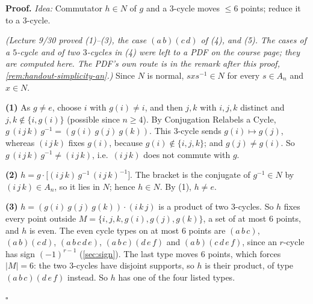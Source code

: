 \documentclass[11pt]{report}
\renewenvironment{proof}[1][Proof]{\noindent\textbf{#1.} }{\hfill$\square$\par\vspace{5pt}}
\begin{document}
\begin{proof}
\textit{Idea:} Commutator $h \in N$ of $g$ and a $3$-cycle moves $\leq 6$ points; reduce it to a $3$-cycle.\par
\textit{(Lecture 9/30 proved (1)--(3), the case $(a\,b)(c\,d)$ of (4), and (5). The cases of a $5$-cycle and of two $3$-cycles in (4) were left to a PDF on the course page; they are computed here. The PDF's own route is in the remark after this proof, \ref{rem:handout-simplicity-an}.)} Since $N$ is normal, $sxs^{-1} \in N$ for every $s \in A_n$ and $x \in N$.

\textbf{(1)} As $g \neq e$, choose $i$ with $g(i) \neq i$, and then $j, k$ with $i, j, k$ distinct and $j, k \notin \{i, g(i)\}$ (possible since $n \geq 4$). By Conjugation Relabels a Cycle, $g\,(i\,j\,k)\,g^{-1} = (g(i)\ g(j)\ g(k))$. This $3$-cycle sends $g(i) \mapsto g(j)$, whereas $(i\,j\,k)$ fixes $g(i)$, because $g(i) \notin \{i, j, k\}$; and $g(j) \neq g(i)$. So $g\,(i\,j\,k)\,g^{-1} \neq (i\,j\,k)$, i.e.\ $(i\,j\,k)$ does not commute with $g$.

\textbf{(2)} $h = g \cdot \big[(i\,j\,k)\,g^{-1}\,(i\,j\,k)^{-1}\big]$. The bracket is the conjugate of $g^{-1} \in N$ by $(i\,j\,k) \in A_n$, so it lies in $N$; hence $h \in N$. By (1), $h \neq e$.

\textbf{(3)} $h = (g(i)\ g(j)\ g(k)) \cdot (i\,k\,j)$ is a product of two $3$-cycles. So $h$ fixes every point outside $M = \{i, j, k, g(i), g(j), g(k)\}$, a set of at most $6$ points, and $h$ is even. The even cycle types on at most $6$ points are $(a\,b\,c)$, $(a\,b)(c\,d)$, $(a\,b\,c\,d\,e)$, $(a\,b\,c)(d\,e\,f)$ and $(a\,b)(c\,d\,e\,f)$, since an $r$-cycle has sign $(-1)^{r-1}$ (\ref{sec:sign}). The last type moves $6$ points, which forces $|M| = 6$: the two $3$-cycles have disjoint supports, so $h$ is their product, of type $(a\,b\,c)(d\,e\,f)$ instead. So $h$ has one of the four listed types.


\end{proof}
\end{document}
